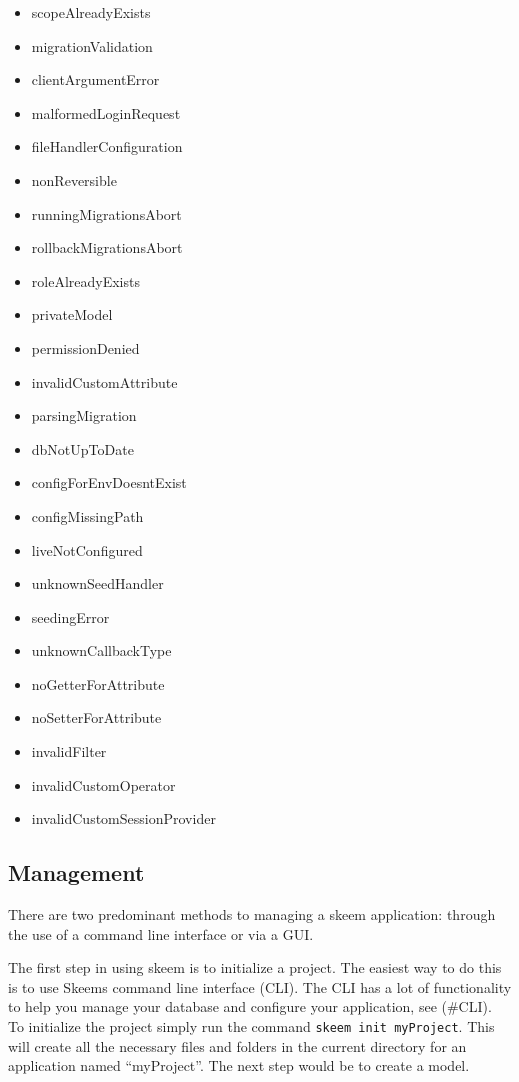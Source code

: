 \documentclass[
  12pt,
]{article}
\newcommand{\passthrough}[1]{#1}
\begin{document}
\begin{multicols}{2}
\begin{itemize}
\item scopeAlreadyExists
\item migrationValidation
\item clientArgumentError
\item malformedLoginRequest
\item fileHandlerConfiguration
\item nonReversible
\item runningMigrationsAbort
\item rollbackMigrationsAbort
\item roleAlreadyExists
\item privateModel
\item permissionDenied
\item invalidCustomAttribute
\item parsingMigration
\item dbNotUpToDate
\item configForEnvDoesntExist
\item configMissingPath
\item liveNotConfigured
\item unknownSeedHandler
\item seedingError
\item unknownCallbackType
\item noGetterForAttribute
\item noSetterForAttribute
\item invalidFilter
\item invalidCustomOperator
\item invalidCustomSessionProvider
\end{itemize}
\end{multicols}

\hypertarget{management}{%
\subsection{Management}\label{management}}

There are two predominant methods to managing a skeem application:
through the use of a command line interface or via a GUI.

The first step in using skeem is to initialize a project. The easiest
way to do this is to use Skeems command line interface (CLI). The CLI
has a lot of functionality to help you manage your database and
configure your application, see (\#CLI). To initialize the project
simply run the command \passthrough{\lstinline!skeem init myProject!}.
This will create all the necessary files and folders in the current
directory for an application named ``myProject''. The next step would be
to create a model.
\end{document}
